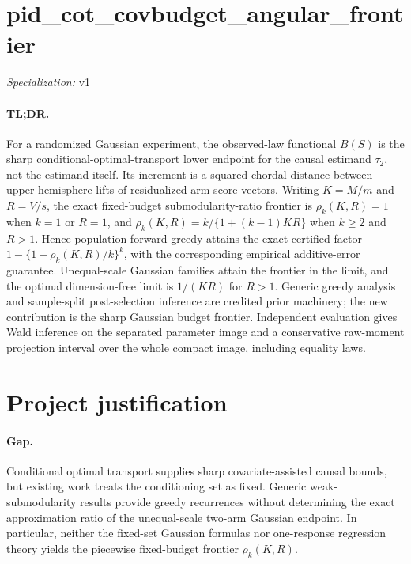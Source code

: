 \documentclass{article}
\begin{document}
\sloppy

\section*{pid\_\allowbreak{}cot\_\allowbreak{}covbudget\_\allowbreak{}angular\_\allowbreak{}frontier}

\noindent\textit{Specialization:} v1\par

\paragraph{TL;DR.} For a randomized Gaussian experiment, the observed-law functional \(B(S)\) is the sharp conditional-optimal-transport lower endpoint for the causal estimand \(\tau_2\), not the estimand itself. Its increment is a squared chordal distance between upper-hemisphere lifts of residualized arm-score vectors. Writing \(K=M/m\) and \(R=V/s\), the exact fixed-budget submodularity-ratio frontier is \(\rho_k(K,R)=1\) when \(k=1\) or \(R=1\), and \(\rho_k(K,R)=k/\{1+(k-1)KR\}\) when \(k\ge2\) and \(R>1\). Hence population forward greedy attains the exact certified factor \(1-\{1-\rho_k(K,R)/k\}^k\), with the corresponding empirical additive-error guarantee. Unequal-scale Gaussian families attain the frontier in the limit, and the optimal dimension-free limit is \(1/(KR)\) for \(R>1\). Generic greedy analysis and sample-split post-selection inference are credited prior machinery; the new contribution is the sharp Gaussian budget frontier. Independent evaluation gives Wald inference on the separated parameter image and a conservative raw-moment projection interval over the whole compact image, including equality laws.

\section{Project justification}

\paragraph{Gap.} Conditional optimal transport supplies sharp covariate-assisted causal bounds, but existing work treats the conditioning set as fixed. Generic weak-submodularity results provide greedy recurrences without determining the exact approximation ratio of the unequal-scale two-arm Gaussian endpoint. In particular, neither the fixed-set Gaussian formulas nor one-response regression theory yields the piecewise fixed-budget frontier \(\rho_k(K,R)\).
\end{document}
